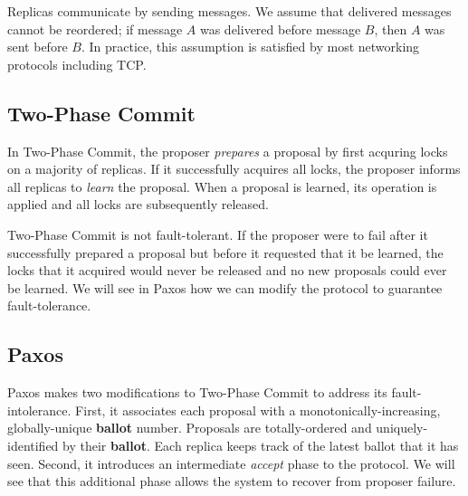 \documentclass[../main.tex]{subfiles}
\begin{document}
  Replicas communicate by sending messages. We assume that delivered messages cannot be reordered;
  if message $A$ was delivered before message $B$, then $A$ was sent before $B$. In practice, this
  assumption is satisfied by most networking protocols including TCP.

  \subsection{Two-Phase Commit}
  In Two-Phase Commit, the proposer \emph{prepares} a proposal by first acquring locks on a majority
  of replicas. If it successfully acquires all locks, the proposer informs all replicas to
  \emph{learn} the proposal. When a proposal is learned, its operation is applied and all locks are
  subsequently released.

  Two-Phase Commit is not fault-tolerant. If the proposer were to fail after it successfully
  prepared a proposal but before it requested that it be learned, the locks that it acquired would
  never be released and no new proposals could ever be learned. We will see in Paxos how we can
  modify the protocol to guarantee fault-tolerance.

  \subsection{Paxos}
  Paxos makes two modifications to Two-Phase Commit to address its fault-intolerance. First, it
  associates each proposal with a monotonically-increasing, globally-unique \textbf{ballot} number.
  Proposals are totally-ordered and uniquely-identified by their \textbf{ballot}. Each replica
  keeps track of the latest ballot that it has seen. Second, it introduces an intermediate
  \emph{accept} phase to the protocol. We will see that this additional phase allows the system to
  recover from proposer failure. \cite{paxos}
\end{document}
